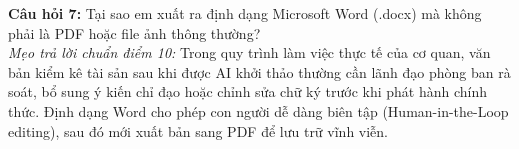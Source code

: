 \begin{checkpointbox}
\textbf{Câu hỏi 7:} Tại sao em xuất ra định dạng Microsoft Word (.docx) mà không phải là PDF hoặc file ảnh thông thường?\\
\textit{Mẹo trả lời chuẩn điểm 10:} Trong quy trình làm việc thực tế của cơ quan, văn bản kiểm kê tài sản sau khi được AI khởi thảo thường cần lãnh đạo phòng ban rà soát, bổ sung ý kiến chỉ đạo hoặc chỉnh sửa chữ ký trước khi phát hành chính thức. Định dạng Word cho phép con người dễ dàng biên tập (Human-in-the-Loop editing), sau đó mới xuất bản sang PDF để lưu trữ vĩnh viễn.
\end{checkpointbox}

